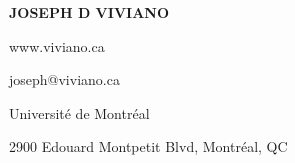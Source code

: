 \documentclass[a4paper,11pt,oneside]{book}
\begin{document}
\thispagestyle{empty} %

\noindent
\begin{minipage}{\textwidth}

    \vspace{0.1in}
    \begin{multicols}{2}

        \vspace*{\fill}
        \huge\textbf{JOSEPH D VIVIANO}
        \vspace*{\fill}

        \columnbreak\normalsize
        \hfill www.viviano.ca\

        \hfill joseph@viviano.ca\

        \hfill Universit\'e de Montr\'eal\

        \hfill 2900 Edouard Montpetit Blvd, Montr\'eal, QC\

    \end{multicols}
    \vspace{0in}
\end{minipage}
\end{document}
